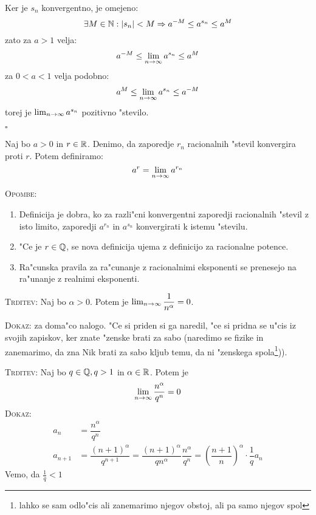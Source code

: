 Ker je $s_n$ konvergentno, je omejeno:
\begin{equation*}
\exists M \in \mathbb{N}: |s_n| < M \Rightarrow a^{-M} \leq a^{s_n} \leq a^M
\end{equation*}
zato za $a > 1$ velja:
\begin{equation*}
a^{-M} \leq \lim_{n \rightarrow \infty} a^{s_n} \leq a^M
\end{equation*}
za $0 < a < 1$ velja podobno:
\begin{equation*}
a^{M} \leq \lim_{n \rightarrow \infty} a^{s_n} \leq a^{-M}
\end{equation*}
torej je $\lim_{n \rightarrow \infty} a^{s_n}$ pozitivno "stevilo. 

\hfill $\square$

 Naj bo $a > 0$ in $r \in \mathbb{R}$. Denimo, da zaporedje $r_n$ racionalnih "stevil konvergira proti $r$. Potem definiramo:
\begin{equation*}
a^r = \lim_{n \rightarrow \infty} a^{r_n}
\end{equation*}

\textsc{Opombe:}
\begin{enumerate}[1)]
	\item Definicija je dobra, ko za razli"cni konvergentni zaporedji racionalnih "stevil z isto limito, zaporedji $a^{r_n}$ in $a^{s_n}$ konvergirati k istemu "stevilu.
	
	\item "Ce je $r \in \mathbb{Q}$, se nova definicija ujema z definicijo za racionalne potence.
	\item Ra"cunska pravila za ra"cunanje z racionalnimi eksponenti se prenesejo na ra"unanje z realnimi eksponenti.
\end{enumerate}
%
\textsc{Trditev:} Naj bo $\alpha > 0$. Potem je $\lim_{n \rightarrow \infty} \dfrac{1}{n^\alpha} = 0$.

\textsc{Dokaz:} za doma"co nalogo. "Ce si priden si ga naredil, "ce si pridna se u"cis iz svojih zapiskov, ker znate "zenske brati za sabo (naredimo se fizike in zanemarimo, da zna Nik brati za sabo kljub temu, da ni "zenskega spola\footnote{lahko se sam odlo"cis ali zanemarimo njegov obstoj, ali pa samo njegov spol})).

\textsc{Trditev:} Naj bo $q \in \mathbb{Q}, q > 1$ in $\alpha \in \mathbb{R}$. Potem je
\begin{equation*}
\lim_{n \rightarrow \infty} \dfrac{n^\alpha}{q^n} = 0
\end{equation*}
\textsc{Dokaz:} 
\begin{align*}
a_n &= \dfrac{n^\alpha}{q^n} \\
a_{n+1} &= \dfrac{(n+1)^\alpha}{q^{n+1}} = \dfrac{(n+1)^\alpha}{q n^\alpha} \dfrac{n^\alpha}{q^n} = \left(\dfrac{n+1}{n}\right)^\alpha \cdot \dfrac{1}{q} a_n
\end{align*}
Vemo, da $\frac{1}{q} < 1$

